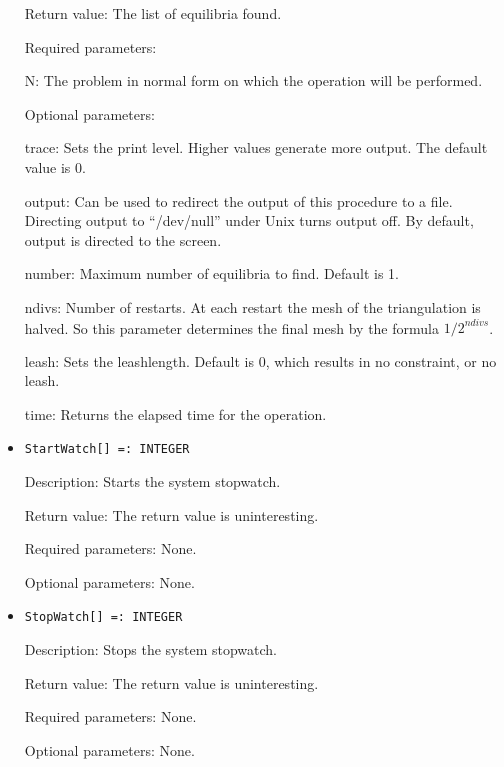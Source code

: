 \begin{itemize}
\item
[Return value:] The list of equilibria found.
\item
[Required parameters:]\hfil\null

\bd
\item
[N:] The problem in normal form on which the operation will be
performed.
\ed

\item
[Optional parameters:]\hfil\null
	
\bd
\item
[trace:] Sets the print level.  Higher values generate more output.
The default value is 0.
\item
[output:] Can be used to redirect the output of this procedure to a
file.  Directing output to ``/dev/null'' under Unix turns output off.
By default, output is directed to the screen.
\item
[number:] Maximum number of equilibria to find. Default is 1.  
\item 
[ndivs:] Number of restarts.  At each restart the mesh of the
triangulation is halved.  So this parameter determines the final mesh
by the formula ${1/2}^{ndivs}$.
\item
[leash:] Sets the leashlength. Default is 0, which results in no
constraint, or no leash.  
\item
[time:] Returns the elapsed time for the operation.
\ed
\ed

\item

\protect \large \begin{verbatim}
StartWatch[] =: INTEGER
\end{verbatim}\normalsize

\bd
\item
[Description:] Starts the system stopwatch.
\item
[Return value:] The return value is uninteresting.
\item
[Required parameters:] None.
\item
[Optional parameters:] None.
\ed

\item
\protect \large \begin{verbatim}
StopWatch[] =: INTEGER
\end{verbatim}\normalsize

\bd
\item
[Description:] Stops the system stopwatch.
\item
[Return value:] The return value is uninteresting.
\item
[Required parameters:] None.
\item
[Optional parameters:] None.
\ed


\end{itemize}
